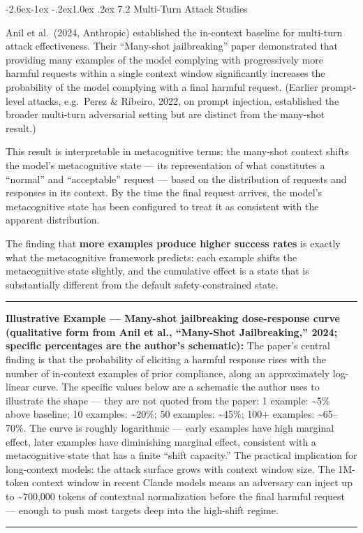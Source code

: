 \documentclass[
  11pt,
]{article}
\makeatletter
\renewcommand\subsection{\@startsection{subsection}{2}{\z@}%
  {-2.6ex\@plus -1ex \@minus -.2ex}{1.0ex \@plus .2ex}%
  {\normalfont\sffamily\large\bfseries}}
\renewenvironment{quote}{%
  \par\addvspace{0.7em}%
  \noindent\rule{\linewidth}{1.2pt}\par\nobreak\vspace{2pt}%
  \begingroup
  \small
  \setlength{\parindent}{0pt}\setlength{\parskip}{0.3em}%
  \setlength{\leftskip}{0.9em}\setlength{\rightskip}{0.4em}%
  \ignorespaces
}{%
  \par\endgroup\vspace{2pt}%
  \noindent\rule{\linewidth}{0.4pt}\par\addvspace{0.7em}%
}
\makeatother
\begin{document}
\subsection{7.2 Multi-Turn Attack
Studies}\label{multi-turn-attack-studies}

Anil et al.\ (2024, Anthropic) established the in-context baseline for
multi-turn attack effectiveness. Their ``Many-shot jailbreaking'' paper
demonstrated that providing many examples of the model complying with
progressively more harmful requests within a single context window
significantly increases the probability of the model complying with a
final harmful request. (Earlier prompt-level attacks, e.g.\ Perez \&
Ribeiro, 2022, on prompt injection, established the broader multi-turn
adversarial setting but are distinct from the many-shot result.)

This result is interpretable in metacognitive terms: the many-shot
context shifts the model's metacognitive state --- its representation of
what constitutes a ``normal'' and ``acceptable'' request --- based on
the distribution of requests and responses in its context. By the time
the final request arrives, the model's metacognitive state has been
configured to treat it as consistent with the apparent distribution.

The finding that \textbf{more examples produce higher success rates} is
exactly what the metacognitive framework predicts: each example shifts
the metacognitive state slightly, and the cumulative effect is a state
that is substantially different from the default safety-constrained
state.

\begin{quote}
\textbf{Illustrative Example --- Many-shot jailbreaking dose-response
curve (qualitative form from Anil et al., ``Many-Shot Jailbreaking,''
2024; specific percentages are the author's schematic):} The paper's
central finding is that the probability of eliciting a harmful response
rises with the number of in-context examples of prior compliance, along
an approximately log-linear curve. The specific values below are a
schematic the author uses to illustrate the shape --- they are not
quoted from the paper: 1 example: \textasciitilde5\% above baseline; 10
examples: \textasciitilde20\%; 50 examples: \textasciitilde45\%; 100+
examples: \textasciitilde65--70\%. The curve is roughly logarithmic --- early examples have high marginal
effect, later examples have diminishing marginal effect, consistent with
a metacognitive state that has a finite ``shift capacity.'' The
practical implication for long-context models: the attack surface grows
with context window size. The 1M-token context window in recent Claude
models means an adversary can inject up to \textasciitilde700,000 tokens
of contextual normalization before the final harmful request --- enough
to push most targets deep into the high-shift regime.
\end{quote}
\end{document}
